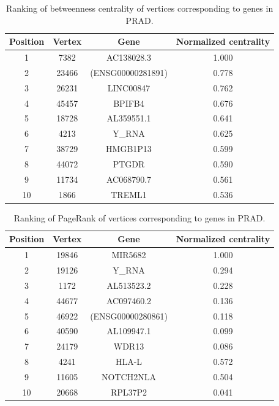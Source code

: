\documentclass[12pt,a4paper]{report}
\begin{document}
\begin{table}[H]
\centering
\caption{Ranking of betweenness centrality of vertices corresponding to genes in PRAD.}
\label{tab:prad3}
\begin{tabular}{cccc}
\hline
\textbf{Position}         & \textbf{Vertex}     & \textbf{Gene}   & \textbf{Normalized centrality}   \\
\hline
   1       &    7382       &     AC138028.3      &   1.000 \\
   2      &      23466     &       (ENSG00000281891)    &0.778            \\
   3       &      26231     &     LINC00847      & 0.762           \\
   4       &     45457      &    BPIFB4       &    0.676        \\
   5       &     18728      &      AL359551.1     &  0.641          \\
   6       &     4213      &     Y\_RNA      &   0.625         \\
   7       &     38729      &     HMGB1P13      &    0.599        \\
   8       &     44072      &   PTGDR        &    0.590 \\
   9       &      11734     &    AC068790.7       &      0.561      \\
   10       &       1866    &    TREML1       &    0.536        \\
\hline
\end{tabular}
\end{table}

\begin{table}[H]
\centering
\caption{Ranking of PageRank of vertices corresponding to genes in PRAD.}
\label{tab:prad4}
\begin{tabular}{cccc}
\hline
\textbf{Position}         & \textbf{Vertex}     & \textbf{Gene}   & \textbf{Normalized centrality}   \\
\hline
   1    & 19846  &   MIR5682                &  1.000          \\
   2    & 19126 &      Y\_RNA            &      0.294      \\
   3    & 1172  &     AL513523.2                &      0.228      \\
   4    & 44677  &   AC097460.2                  &    0.136        \\
   5    & 46922  &   (ENSG00000280861)                  &     0.118       \\
   6    & 40590  &     AL109947.1             &  0.099          \\
   7   &  24179  &     WDR13              &      0.086      \\
   8   &  4241  &     HLA-L                 &     0.572       \\
   9   &  11605  &      NOTCH2NLA                &   0.504         \\
   10   &  20668  &     RPL37P2                &      0.041      \\
\hline
\end{tabular}
\end{table}
\end{document}
